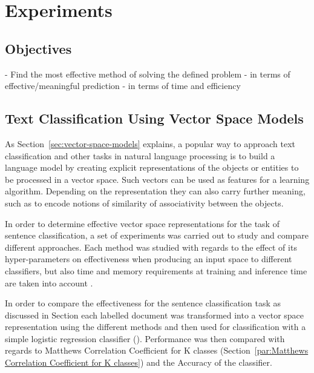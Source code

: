 
\thispagestyle{empty}

\section{Experiments}
\label{sec:Experiments}

\subsection{Objectives}
\label{sub:Objectives}

- Find the most effective method of solving the defined problem
- in terms of effective/meaningful prediction
- in terms of time and efficiency 




\subsection{Text Classification Using Vector Space Models}
\label{Text Classification Using Vector Space Models}

As Section~\ref{sec:vector-space-models} explains, a popular way to approach text classification and other tasks in natural language processing is to build a language model by creating explicit representations of the objects or entities to be processed in a vector space. Such vectors can be used as features for a learning algorithm. Depending on the representation they can also carry further meaning, such as to encode notions of similarity of associativity between the objects.

In order to determine effective vector space representations for the task of sentence classification, a set of experiments was carried out to study and compare different approaches. Each method was studied with regards to the effect of its hyper-parameters on effectiveness when producing an input space to different classifiers, but also time and memory requirements at training and inference time are taken into account .

In order to compare the effectiveness for the sentence classification task as discussed in Section each labelled document was transformed into a vector space representation using the different methods and then used for classification with a simple logistic regression classifier (). Performance was then compared with regards to Matthews Correlation Coefficient for K classes (Section~\ref{par:Matthews Correlation Coefficient for K classes}) and the Accuracy  of the classifier.

